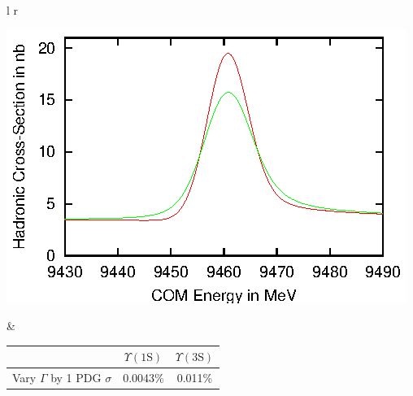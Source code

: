 \begin{slide*}
\begin{minipage}[t]{\linewidth}
\begin{center}
  \begin{tabular}{l r}
    \begin{minipage}{0.25\linewidth}
      \includegraphics[width=\linewidth]{biggam_lineshape.eps}
    \end{minipage} &
    \begin{minipage}{0.6\linewidth}
      \begin{center}
        \begin{tabular}{r | c | c}
          & $\Upsilon(\mbox{1S})$ & $\Upsilon(\mbox{3S})$ \\\hline
	  Vary $\Gamma$ by 1 PDG $\sigma$ & 0.0043\% & 0.011\% \\
        \end{tabular}
      \end{center}
    \end{minipage} \\
  \end{tabular}
\end{center}

\end{minipage}

\end{slide*}


